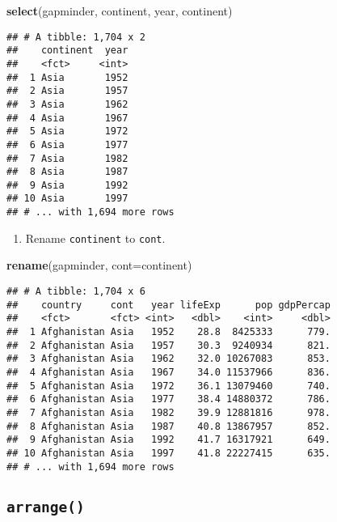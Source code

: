 \documentclass[]{article}
\newenvironment{Shaded}{\begin{snugshade}}{\end{snugshade}}
\newcommand{\KeywordTok}[1]{\textcolor[rgb]{0.13,0.29,0.53}{\textbf{{#1}}}}
\newcommand{\DataTypeTok}[1]{\textcolor[rgb]{0.13,0.29,0.53}{{#1}}}
\newcommand{\NormalTok}[1]{{#1}}
\providecommand{\tightlist}{%
  \setlength{\itemsep}{0pt}\setlength{\parskip}{0pt}}
\begin{document}
\begin{Shaded}
\begin{Highlighting}[]
\KeywordTok{select}\NormalTok{(gapminder, continent, year, continent)}
\end{Highlighting}
\end{Shaded}

\begin{verbatim}
## # A tibble: 1,704 x 2
##    continent  year
##    <fct>     <int>
##  1 Asia       1952
##  2 Asia       1957
##  3 Asia       1962
##  4 Asia       1967
##  5 Asia       1972
##  6 Asia       1977
##  7 Asia       1982
##  8 Asia       1987
##  9 Asia       1992
## 10 Asia       1997
## # ... with 1,694 more rows
\end{verbatim}

\begin{enumerate}
\def\labelenumi{\arabic{enumi}.}
\setcounter{enumi}{4}
\tightlist
\item
  Rename \texttt{continent} to \texttt{cont}.
\end{enumerate}

\begin{Shaded}
\begin{Highlighting}[]
\KeywordTok{rename}\NormalTok{(gapminder, }\DataTypeTok{cont=}\NormalTok{continent)}
\end{Highlighting}
\end{Shaded}

\begin{verbatim}
## # A tibble: 1,704 x 6
##    country     cont   year lifeExp      pop gdpPercap
##    <fct>       <fct> <int>   <dbl>    <int>     <dbl>
##  1 Afghanistan Asia   1952    28.8  8425333      779.
##  2 Afghanistan Asia   1957    30.3  9240934      821.
##  3 Afghanistan Asia   1962    32.0 10267083      853.
##  4 Afghanistan Asia   1967    34.0 11537966      836.
##  5 Afghanistan Asia   1972    36.1 13079460      740.
##  6 Afghanistan Asia   1977    38.4 14880372      786.
##  7 Afghanistan Asia   1982    39.9 12881816      978.
##  8 Afghanistan Asia   1987    40.8 13867957      852.
##  9 Afghanistan Asia   1992    41.7 16317921      649.
## 10 Afghanistan Asia   1997    41.8 22227415      635.
## # ... with 1,694 more rows
\end{verbatim}

\subsection{\texorpdfstring{\texttt{arrange()}}{arrange()}}\label{arrange}
\end{document}

